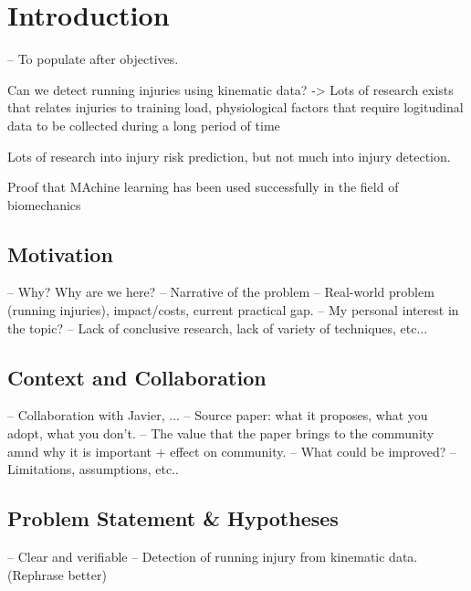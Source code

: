\chapter{Introduction}\label{chap:introduction}
-- To populate after objectives.

Can we detect running injuries using kinematic data? -> Lots of research exists that relates injuries to training load, physiological factors that require logitudinal data to be collected during a long period of time

Lots of research into injury risk prediction, but not much into injury detection.


Proof that MAchine learning has been used successfully in the field of biomechanics 




\section{Motivation}\label{sec:intro-motivation}
-- Why? Why are we here?
-- Narrative of the problem
-- Real-world problem (running injuries), impact/costs, current practical gap.
-- My personal interest in the topic?
-- Lack of conclusive research, lack of variety of techniques, etc...

\section{Context and Collaboration}\label{sec:intro-context}
-- Collaboration with Javier, ...
-- Source paper: what it proposes, what you adopt, what you don't.
    -- The value that the paper brings to the community amnd why it is important + effect on community.
    -- What could be improved?
    -- Limitations, assumptions, etc..

\section{Problem Statement \& Hypotheses}\label{sec:intro-problem-hypotheses}
-- Clear and verifiable
-- Detection of running injury from kinematic data. (Rephrase better)


